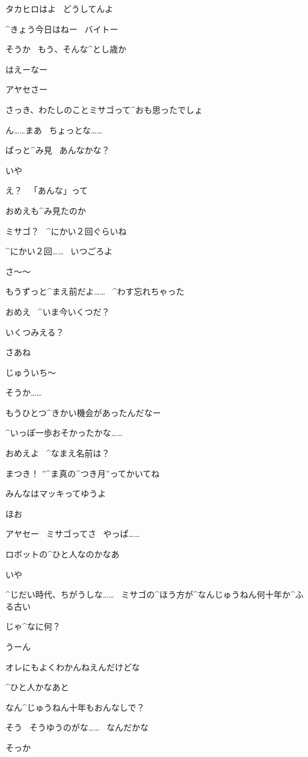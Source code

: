 \page
\Y タカヒロはよ
\ どうしてんよ

\M ^{きょう}{今日}はねー
\ バイトー

\Y そうか
\ もう、そんな^{とし}{歳}か

\Y はえーなー

\M アヤセさー

\M さっき、わたしのことミサゴって^{おも}{思}ったでしょ

\Y ん……まあ
\ ちょっとな……

\page
\M ぱっと^{み}{見}
\ あんなかな？

\Y いや

\Y え？
\ 「あんな」って

\Y おめえも^{み}{見}たのか

\M ミサゴ？
\ ^{にかい}{２回}ぐらいね

\Y ^{にかい}{２回}……
\ いつごろよ

\M さ〜〜

\M もうずっと^{まえ}{前}だよ……
\ ^{わす}{忘}れちゃった

\page
\Y おめえ
\ ^{いま}{今}いくつだ？

\M いくつみえる？

\Y さあね

\M じゅういち〜

\Y そうか……

\Y もうひとつ^{きかい}{機会}があったんだなー

\Y ^{いっぽ}{一歩}おそかったかな……

\page
\Y おめえよ
\ ^{なまえ}{名前}は？

\M まつき！
”^{ま}{真}の^{つき}{月}”ってかいてね

\M みんなはマッキってゆうよ

\Y ほお

\M アヤセー
\ ミサゴってさ
\ やっぱ……

\M ロボットの^{ひと}{人}なのかなあ

\Y いや

\Y ^{じだい}{時代}、ちがうしな……
\ ミサゴの^{ほう}{方}が^{なんじゅうねん}{何十年}か^{ふる}{古}い

\page
\M じゃ^{なに}{何}？

\Y うーん

\Y オレにもよくわかんねえんだけどな

\Y ^{ひと}{人}かなあと

\M なん^{じゅうねん}{十年}もおんなしで？

\Y そう
\ そうゆうのがな……
\ なんだかな

\M そっか

